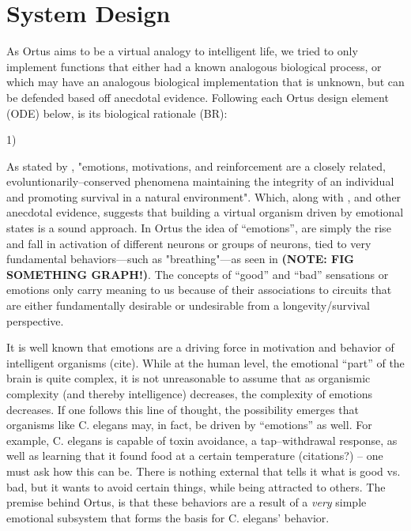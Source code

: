 \documentclass[letterpaper]{article}
\begin{document}
\section{System Design}


As Ortus aims to be a virtual analogy to intelligent life, we tried to only implement functions that either had a known analogous biological process, or which may have an analogous biological implementation that is unknown, but can be defended based off anecdotal evidence. Following each Ortus design element (ODE) below, is its biological rationale (BR):





1)

As stated by \cite{Verma2015}, "emotions, motivations, and reinforcement are a closely related, evoluntionarily--conserved phenomena maintaining the integrity of an individual and promoting survival in a natural environment". Which, along with \cite{Gore2015}, and other anecdotal evidence, suggests that building a virtual organism driven by emotional states is a sound approach. In Ortus the idea of ``emotions'', are simply the rise and fall in activation of different neurons or groups of neurons, tied to very fundamental behaviors---such as "breathing"---as seen in \textbf{(NOTE: FIG SOMETHING GRAPH!)}. The concepts of ``good'' and ``bad'' sensations or emotions only carry meaning to us because of their associations to circuits that are either fundamentally desirable or undesirable from a longevity/survival perspective.

It is well known that emotions are a driving force in motivation and behavior of intelligent organisms (cite). While at the human level, the emotional ``part'' of the brain is quite complex, it is not unreasonable to assume that as organismic complexity (and thereby intelligence) decreases, the complexity of emotions decreases. If one follows this line of thought, the possibility emerges that organisms like C. elegans may, in fact, be driven by ``emotions'' as well. For example, C. elegans is capable of toxin avoidance, a tap--withdrawal response, as well as learning that it found food at a certain temperature (citations?) -- one must ask how this can be. There is nothing external that tells it what is good vs. bad, but it wants to avoid certain things, while being attracted to others. The premise behind Ortus, is that these behaviors are a result of a \textit{very} simple emotional subsystem that forms the basis for C. elegans' behavior.
\end{document}
